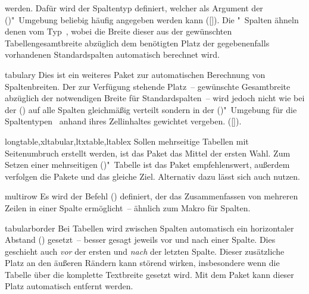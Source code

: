 \begin{packages}
  werden. Dafür wird der Spaltentyp  definiert, welcher als Argument 
  der ()"~Umgebung beliebig häufig 
  angegeben werden kann 
  ([]). Die 
  "~Spalten ähneln denen vom Typ~, wobei die 
  Breite dieser aus der gewünschten Tabellengesamtbreite abzüglich dem 
  benötigten Platz der gegebenenfalls vorhandenen Standardspalten automatisch 
  berechnet wird.
\item[tabulary]
  Dies ist ein weiteres Paket zur automatischen Berechnung von Spaltenbreiten. 
  Der zur Verfügung stehende Platz~-- gewünschte Gesamtbreite abzüglich der 
  notwendigen Breite für Standardspalten~-- wird jedoch nicht wie bei der 
  () auf alle Spalten gleichmäßig 
  verteilt sondern in der ()"~Umgebung 
  für die Spaltentypen~ anhand ihres Zellinhaltes gewichtet 
  vergeben. 
  ([]). 
\item[longtable,xltabular,ltxtable,ltablex]
  Sollen mehrseitige Tabellen mit Seitenumbruch erstellt werden, ist das Paket
   das Mittel der ersten Wahl. Zum Setzen einer mehrseitigen 
  ()"~Tabelle ist das Paket 
   empfehlenswert, außerdem verfolgen die Pakete 
   und  das gleiche Ziel. Alternativ dazu 
  lässt sich auch  nutzen.
\item[multirow]
  Es wird der Befehl () definiert, der das 
  Zusammenfassen von mehreren Zeilen in einer Spalte ermöglicht~-- ähnlich zum 
  Makro  für Spalten.
\item[tabularborder]
  Bei Tabellen wird zwischen Spalten automatisch ein horizontaler Abstand 
  () gesetzt~-- besser gesagt jeweils vor und nach einer 
  Spalte. Dies geschieht auch \emph{vor} der ersten und \emph{nach} der letzten 
  Spalte. Dieser zusätzliche Platz an den äußeren Rändern kann störend wirken, 
  insbesondere wenn die Tabelle über die komplette Textbreite gesetzt wird. Mit 
  dem Paket  kann dieser Platz automatisch entfernt 
  werden.
  

\end{packages}
